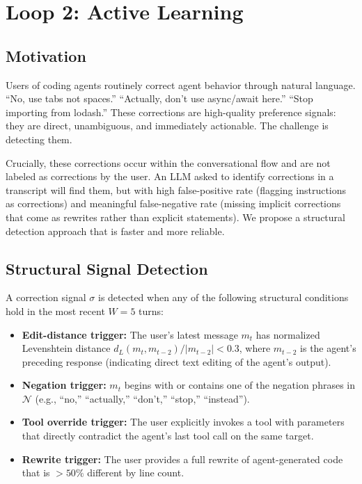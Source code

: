 \section{Loop 2: Active Learning}

\label{sec:loop2}

\subsection{Motivation}

Users of coding agents routinely correct agent behavior through natural
language. ``No, use tabs not spaces.'' ``Actually, don't use async/await here.''
``Stop importing from lodash.'' These corrections are high-quality preference
signals: they are direct, unambiguous, and immediately actionable. The challenge
is detecting them.

Crucially, these corrections occur within the conversational flow and are not
labeled as corrections by the user. An LLM asked to identify corrections in a
transcript will find them, but with high false-positive rate (flagging
instructions as corrections) and meaningful false-negative rate (missing
implicit corrections that come as rewrites rather than explicit statements).
We propose a structural detection approach that is faster and more reliable.

\subsection{Structural Signal Detection}

\begin{definition}
\label{def:correction}
A correction signal $\sigma$ is detected when any of the following structural
conditions hold in the most recent $W=5$ turns:
\begin{itemize}[leftmargin=1.5em, nosep]
    \item \textbf{Edit-distance trigger:} The user's latest message $m_t$ has
          normalized Levenshtein distance $d_L(m_t, m_{t-2}) / |m_{t-2}| < 0.3$,
          where $m_{t-2}$ is the agent's preceding response (indicating direct
          text editing of the agent's output).
    \item \textbf{Negation trigger:} $m_t$ begins with or contains one of
          the negation phrases in $\mathcal{N}$ (e.g., ``no,'' ``actually,''
          ``don't,'' ``stop,'' ``instead'').
    \item \textbf{Tool override trigger:} The user explicitly invokes a tool
          with parameters that directly contradict the agent's last tool call
          on the same target.
    \item \textbf{Rewrite trigger:} The user provides a full rewrite of
          agent-generated code that is $>50\%$ different by line count.
\end{itemize}
\end{definition}

